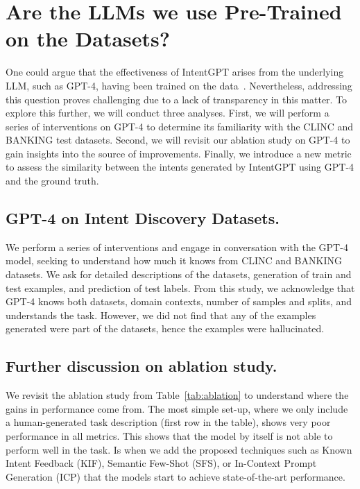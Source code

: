 \documentclass[11pt]{article}
\begin{document}
\section{Are the LLMs we use Pre-Trained on the Datasets?}\label{gpt-trained-on-data}

One could argue that the effectiveness of IntentGPT arises from the underlying LLM, such as GPT-4, having been trained on the data~\citep{mireshghallah2022quantifying,mattern2023membership}. Nevertheless, addressing this question proves challenging due to a lack of transparency in this matter. To explore this further, we will conduct three analyses. First, we will perform a series of interventions on GPT-4 to determine its familiarity with the CLINC and BANKING test datasets. Second, we will revisit our ablation study on GPT-4 to gain insights into the source of improvements. Finally, we introduce a new metric to assess the similarity between the intents generated by IntentGPT using GPT-4 and the ground truth.

\subsection{GPT-4 on Intent Discovery Datasets.} We perform a series of interventions and engage in conversation with the GPT-4 model, seeking to understand how much it knows from CLINC and BANKING datasets. We ask for detailed descriptions of the datasets, generation of train and test examples, and prediction of test labels. From this study, we acknowledge that GPT-4 knows both datasets, domain contexts, number of samples and splits, and understands the task. However, we did not find that any of the examples generated were part of the datasets, hence the examples were hallucinated. 

\subsection{Further discussion on ablation study.} We revisit the ablation study from Table~\ref{tab:ablation} to understand where the gains in performance come from. The most simple set-up, where we only include a human-generated task description (first row in the table), shows very poor performance in all metrics. This shows that the model by itself is not able to perform well in the task. Is when we add the proposed techniques such as Known Intent Feedback (KIF), Semantic Few-Shot (SFS), or In-Context Prompt Generation (ICP) that the models start to achieve state-of-the-art performance.
\end{document}
